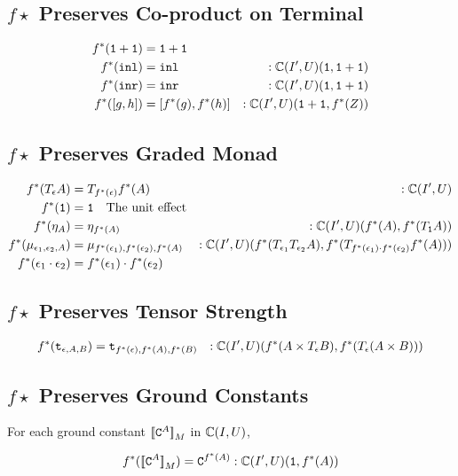 {\subsection{$f\star$ Preserves Co-product on Terminal}

\begin{align}
    f^*(\texttt{1}+\texttt{1}) &= \texttt{1}+\texttt{1}\\
    f^*(\texttt{inl})  &= \texttt{inl}&:\mathbb{C}(I', U)(\texttt{1}, \texttt{1}+\texttt{1}) \\
    f^*(\texttt{inr}) &= \texttt{inr}&:\mathbb{C}(I', U)(\texttt{1}, \texttt{1}+\texttt{1}) \\
    f^*([g, h]) &= [f^*(g), f^*(h)]&:\mathbb{C}(I', U)(\texttt{1}+\texttt{1}, f^*(Z))
\end{align}

\subsection{$f\star$ Preserves Graded Monad}
\begin{align}
    f^*(T_{\epsilon}{A}) &= T_{f^*(\epsilon)}{f^*(A)}&:\mathbb{C}(I', U)\\
    f^*(\texttt{1}) &= \texttt{1} \quad\text{The unit effect}\\
    f^*(\eta_{A}) &= \eta_{f^*(A)}&:\mathbb{C}(I', U)(f^*(A), f^*(T_{\texttt{1}}{A}))\\
    f^*(\mu_{\epsilon_1, \epsilon_2, A}) &= \mu_{f^*(\epsilon_1), f^*(\epsilon_2), f^*(A)}&:\mathbb{C}(I', U)(f^*(T_{\epsilon_1}{T_{\epsilon_2}{A}}), f^*(T_{f^*(\epsilon_1)\cdot f^*(\epsilon_2)}{f^*(A)}))\\
    f^*(\epsilon_1\cdot\epsilon_2) &= f^*(\epsilon_1)\cdot f^*(\epsilon_2)\\
\end{align}

\subsection{$f\star$ Preserves Tensor Strength}
\begin{align}
    f^*(\texttt{t}_{\epsilon, A, B}) &= \texttt{t}_{f^*(\epsilon), f^*(A), f^*(B)} &: \mathbb{C}(I', U)(f^*(A\times T_{\epsilon}{B}), f^*(T_{\epsilon}{(A\times B)}))
\end{align}
\subsection{$f\star$ Preserves Ground Constants}
For each ground constant ${\bf [\![}\texttt{C}^{A}{\bf ]\!]}_M$ in $\mathbb{C}(I, U)$,

\begin{align}
    f^*({\bf [\![}\texttt{C}^{A}{\bf ]\!]}_M) = \texttt{C}^{f^*(A)} : \mathbb{C}(I', U)(\texttt{1}, f^*(A))
\end{align}
}
